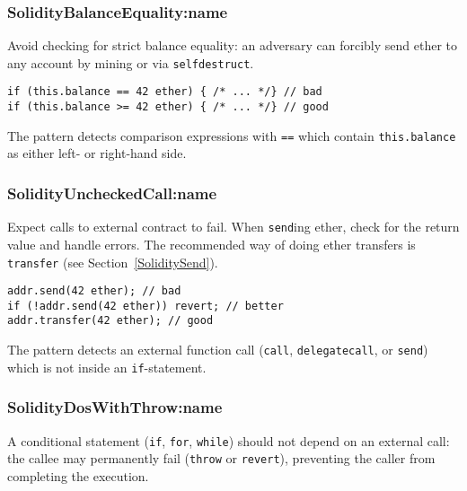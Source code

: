 \subsubsection{\let\letcs\texapiletcs \usevalue SolidityBalanceEquality:name \let\letcs\etoolboxletcs}
\label{SolidityBalanceEquality}

Avoid checking for strict balance equality: an adversary can forcibly send ether to any account by mining or via \texttt{selfdestruct}.
\begin{lstlisting}[language=Solidity]
if (this.balance == 42 ether) { /* ... */} // bad
if (this.balance >= 42 ether) { /* ... */} // good
\end{lstlisting}

The pattern detects comparison expressions with \texttt{==} which contain \texttt{this.balance} as either left- or right-hand side.

\subsubsection{\let\letcs\texapiletcs \usevalue SolidityUncheckedCall:name \let\letcs\etoolboxletcs} \label{SolidityUncheckedCall}

Expect calls to external contract to fail.
When \texttt{send}ing ether, check for the return value and handle errors.
The recommended way of doing ether transfers is \texttt{transfer} (see Section~\ref{SoliditySend}).
\begin{lstlisting}[language=Solidity]
addr.send(42 ether); // bad
if (!addr.send(42 ether)) revert; // better
addr.transfer(42 ether); // good
\end{lstlisting}

The pattern detects an external function call (\texttt{call}, \texttt{delegatecall}, or \texttt{send}) which is not inside an \texttt{if}-statement.

\subsubsection{\let\letcs\texapiletcs \usevalue SolidityDosWithThrow:name \let\letcs\etoolboxletcs} \label{SolidityDosWithThrow}

A conditional statement (\texttt{if}, \texttt{for}, \texttt{while}) should not depend on an external call: the callee may permanently fail (\texttt{throw} or \texttt{revert}), preventing the caller from completing the execution.

